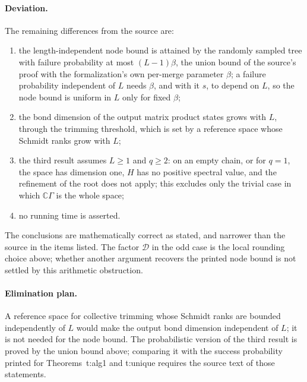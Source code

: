 \documentclass{article}
\begin{document}
\paragraph{Deviation.}
The remaining differences from the source are:
\begin{enumerate}
    \item the length-independent node bound is attained by the randomly
          sampled tree with failure probability at most $(L-1)\beta$, the
          union bound of the source's proof with the formalization's own
          per-merge parameter $\beta$; a failure probability independent of
          $L$ needs $\beta$, and with it $s$, to depend on $L$, so the node
          bound is uniform in $L$ only for fixed $\beta$;
    \item the bond dimension of the output matrix product states grows with
          $L$, through the trimming threshold, which is set by a reference space
          whose Schmidt ranks grow with $L$;
    \item the third result assumes $L\ge1$ and $q\ge2$: on an empty chain, or for $q=1$,
          the space has dimension one, $H$ has no positive spectral value, and the
          refinement of the root does not apply; this excludes only the trivial
          case in which $\mathbb C\Gamma$ is the whole space;
    \item no running time is asserted.
\end{enumerate}
The conclusions are mathematically correct as stated, and narrower than the
source in the items listed. The factor $\mathcal D$ in the odd case is the local
rounding choice above; whether another argument recovers the printed
node bound is not settled by this arithmetic obstruction.

\paragraph{Elimination plan.}
A reference space for collective trimming whose Schmidt ranks are bounded
independently of $L$ would make the output bond dimension independent of $L$;
it is not needed for the node bound. The probabilistic version of the third result is
proved by the union bound above; comparing it with the success probability
printed for Theorems~t:alg1 and t:unique requires the source text of those
statements.



\end{document}
